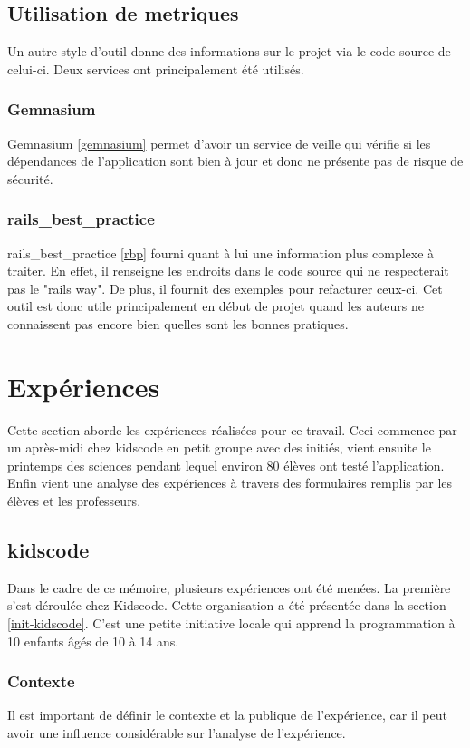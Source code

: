 \subsection{Utilisation de metriques}%
Un autre style d'outil donne des informations sur le projet via le code source de celui-ci. Deux services ont principalement été utilisés.

\subsubsection{Gemnasium}
Gemnasium \ref{gemnasium} permet d'avoir un service de veille qui vérifie si les dépendances de l'application sont bien à jour et donc ne présente pas de risque de sécurité.

\subsubsection{rails\_best\_practice}
rails\_best\_practice \ref{rbp} fourni quant à lui une information plus complexe à traiter. En effet, il renseigne les endroits dans le code source qui ne respecterait pas le "rails way". De plus, il fournit des exemples pour refacturer ceux-ci. Cet outil est donc utile principalement en début de projet quand les auteurs ne connaissent pas encore bien quelles sont les bonnes pratiques.

\section{Expériences}
Cette section aborde les expériences réalisées pour ce travail. Ceci commence par un après-midi chez kidscode en petit groupe avec des initiés, vient ensuite le printemps des sciences pendant lequel environ 80 élèves ont testé l'application. Enfin vient une analyse des expériences à travers des formulaires remplis par les élèves et les professeurs.
\subsection{kidscode}
\label{kidscode}
Dans le cadre de ce mémoire, plusieurs expériences ont été menées. La première s'est déroulée chez Kidscode. Cette organisation a été présentée dans la section \ref{init-kidscode}. C'est une petite initiative locale qui apprend la programmation à 10 enfants âgés de 10 à 14 ans.

\subsubsection{Contexte}
\label{context-kidscode}
Il est important de définir le contexte et la publique de l'expérience, car il peut avoir une influence considérable sur l'analyse de l'expérience.\\

